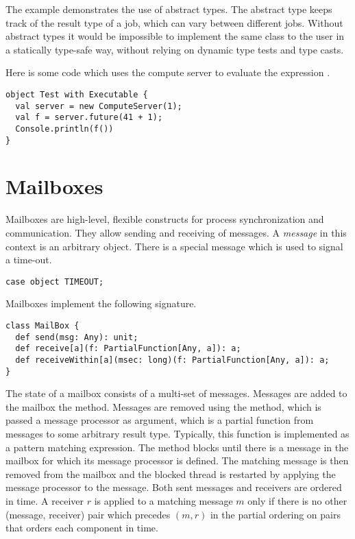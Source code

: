 {The example demonstrates the use of abstract types. The abstract type
 keeps track of the result type of a job, which can vary
between different jobs. Without abstract types it would be impossible
to implement the same class to the user in a statically type-safe
way, without relying on dynamic type tests and type casts.


Here is some code which uses the compute server to evaluate 
the expression .
\begin{lstlisting}
object Test with Executable {
  val server = new ComputeServer(1);
  val f = server.future(41 + 1);
  Console.println(f())
}
\end{lstlisting}

\section{Mailboxes}
\label{sec:mailbox}

Mailboxes are high-level, flexible constructs for process
synchronization and communication. They allow sending and receiving of
messages. A {\em message} in this context is an arbitrary object.
There is a special message  which is used to signal a
time-out.
\begin{lstlisting}
case object TIMEOUT;
\end{lstlisting}
Mailboxes implement the following signature.
\begin{lstlisting}
class MailBox {
  def send(msg: Any): unit;
  def receive[a](f: PartialFunction[Any, a]): a;
  def receiveWithin[a](msec: long)(f: PartialFunction[Any, a]): a;
}
\end{lstlisting}
The state of a mailbox consists of a multi-set of messages.
Messages are added to the mailbox the  method. Messages
are removed using the  method, which is passed a message
processor  as argument, which is a partial function from
messages to some arbitrary result type. Typically, this function is
implemented as a pattern matching expression. The 
method blocks until there is a message in the mailbox for which its
message processor is defined.  The matching message is then removed
from the mailbox and the blocked thread is restarted by applying the
message processor to the message. Both sent messages and receivers are
ordered in time. A receiver $r$ is applied to a matching message $m$
only if there is no other (message, receiver) pair which precedes $(m,
r)$ in the partial ordering on pairs that orders each component in
time.

}
